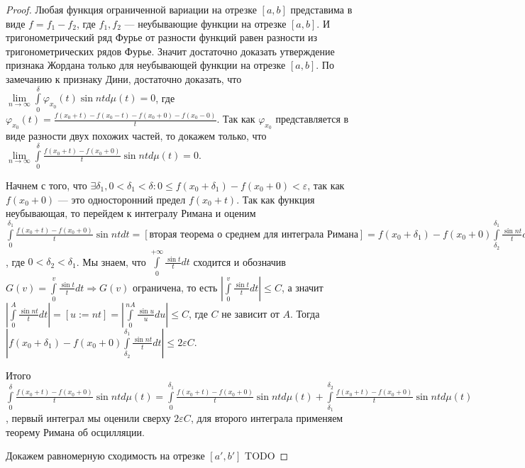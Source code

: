 \begin{proof}
	Любая функция ограниченной вариации на отрезке $[a,b]$ представима в виде $f=f_1-f_2$, где $f_1,f_2$ --- неубывающие функции на отрезке $[a,b]$. И тригонометрический ряд Фурье от разности функций равен разности из тригонометрических рядов Фурье. Значит достаточно доказать утверждение признака Жордана только для неубывающей функции на отрезке $[a,b]$. По замечанию к признаку Дини, достаточно доказать, что $\lim\limits_{n\to\infty}\int\limits_0^\delta\varphi_{x_0}(t)\sin ntd\mu(t)=0$, где $\varphi_{x_0}(t)=\frac{f(x_0+t)-f(x_0-t)-f(x_0+0)-f(x_0-0)}{t}$. Так как $\varphi_{x_0}$ представляется в виде разности двух похожих частей, то докажем только, что $\lim\limits_{n\to\infty}\int\limits_0^\delta \frac{f(x_0+t)-f(x_0+0)}{t} \sin ntd\mu(t)=0$.
	
	Начнем с того, что ${\exists\delta_1, 0<\delta_1<\delta:0\leqslant f(x_0+\delta_1)- f(x_0+0)<\varepsilon}$, так как $f(x_0+0)$ --- это односторонний предел $f(x_0+t)$. Так как функция неубывающая, то перейдем к интегралу Римана и оценим $\int\limits_0^{\delta_1}\frac{f(x_0+t)-f(x_0+0)}{t}\sin ntdt=[\text{вторая теорема о среднем для интеграла Римана}]=f(x_0+\delta_1)-f(x_0+0)\int\limits_{\delta_2}^{\delta_1}\frac{\sin nt}{t}dt$, где $0<\delta_2<\delta_1$. Мы знаем, что $\int\limits_0^{+\infty}\frac{\sin t}{t}dt$ сходится и обозначив $G(v)=\int\limits_{0}^v\frac{\sin t}{t}dt\Rightarrow G(v)$ ограничена, то есть $\left|\int\limits_0^v\frac{\sin t}{t}dt\right|\leqslant C$, а значит $\left|\int\limits_0^A\frac{\sin nt}{t}dt\right|=[u:=nt]=\left|\int\limits_0^{nA}\frac{\sin u}{u}du\right|\leqslant C$, где $C$ не зависит от $A$. Тогда $\left|f(x_0+\delta_1)-f(x_0+0)\int\limits_{\delta_2}^{\delta_1}\frac{\sin nt}{t}dt\right|\leqslant 2\varepsilon C$.
	
	Итого $\int\limits_0^\delta \frac{f(x_0+t)-f(x_0+0)}{t} \sin ntd\mu(t)=\int\limits_0^{\delta_1} \frac{f(x_0+t)-f(x_0+0)}{t} \sin ntd\mu(t)+\int\limits_{\delta_1}^{\delta_2} \frac{f(x_0+t)-f(x_0+0)}{t} \sin ntd\mu(t)$, первый интеграл мы оценили сверху $2\varepsilon C$, для второго интеграла применяем теорему Римана об осцилляции.
	
	Докажем равномерную сходимость на отрезке $[a',b']$ TODO
\end{proof}






















